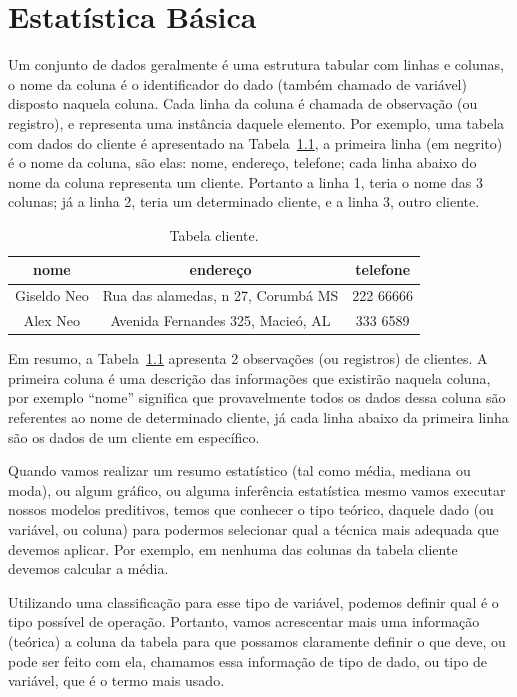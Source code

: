 \documentclass[a4paper,12pt]{book}
\begin{document}
\chapter{Estatística Básica}
	
Um conjunto de dados geralmente é uma estrutura tabular com linhas e colunas, o nome da coluna é o identificador do dado (também chamado de variável) disposto naquela coluna. Cada linha da coluna é chamada de observação (ou registro), e representa uma instância daquele elemento. Por exemplo, uma tabela com dados do cliente é apresentado na Tabela~\ref{tbl:cliente}, a primeira linha (em negrito) é o nome da coluna, são elas: nome, endereço, telefone; cada linha abaixo do nome da coluna representa um cliente. Portanto a linha 1, teria o nome das 3 colunas; já a linha 2, teria um determinado cliente, e a linha 3, outro cliente.

\begin{table}[!h]
	\centering
	\caption{Tabela cliente.}
	\begin{tabular}{|c|c|c|}
	\hline	
	\textbf{nome} & \textbf{endereço} & \textbf{telefone} \\
	\hline	
	Giseldo Neo & Rua das alamedas, n 27, Corumbá MS & 222 66666 \\
	\hline	
	Alex Neo & Avenida Fernandes 325, Macieó, AL& 333 6589 \\
	\hline
	\end{tabular}
	\label{tbl:cliente}	
\end{table}		

Em resumo, a Tabela~\ref{tbl:cliente} apresenta 2 observações (ou registros) de clientes. A primeira coluna é uma descrição das informações que existirão naquela coluna, por exemplo ``nome'' significa que provavelmente todos os dados dessa coluna são referentes ao nome de determinado cliente, já cada linha abaixo da primeira linha são os dados de um cliente em específico. 

Quando vamos realizar um resumo estatístico (tal como média, mediana ou moda), ou algum gráfico, ou alguma inferência estatística mesmo vamos executar nossos modelos preditivos, temos que conhecer o tipo teórico, daquele dado (ou variável, ou coluna) para podermos selecionar qual a técnica mais adequada que devemos aplicar. Por exemplo, em nenhuma das colunas da tabela cliente devemos calcular a média. 

Utilizando uma classificação para esse tipo de variável, podemos definir qual é o tipo possível de operação. Portanto, vamos acrescentar mais uma informação (teórica) a coluna da tabela para que possamos claramente definir o que deve, ou pode ser feito com ela, chamamos essa informação de tipo de dado, ou tipo de variável, que é o termo mais usado. 
\end{document}

